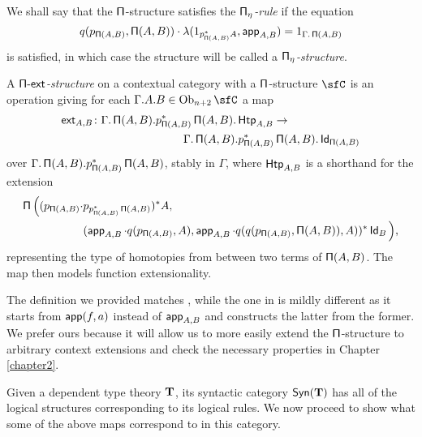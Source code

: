 \begin{defn}
\noindent
  We shall say that the $\operatorname{\mathsf{\Pi}}$-structure satisfies the
  \emph{$\operatorname{\mathsf{\Pi}_\eta}$-rule} if the equation
  \[q(p_{\operatorname{\mathsf{\Pi}}(A,B)},\operatorname{\mathsf{\Pi}}(A,B))\cdot\lambda(1_{p^*_{\operatorname{\mathsf{\Pi}}(A,B)}A},\operatorname{\mathsf{app}}_{A,B})=1_{\Gamma.\operatorname{\mathsf{\Pi}}(A,B)}\]
  is satisfied, in which case the structure will be called a
  \emph{$\operatorname{\mathsf{\Pi}_\eta}$-structure}. 

\noindent
  A \emph{$\operatorname{\mathsf{\Pi-ext}}$-structure} on a contextual category with a $\operatorname{\mathsf{\Pi}}$-structure
  $\sfC$ is an operation giving for each $\Gamma.A.B\in\Ob_{n+2}\sfC$ a map
  \begin{align*}
    \operatorname{\mathsf{ext}}_{A,B} &\colon
    \Gamma.\operatorname{\mathsf{\Pi}}(A,B).p^*_{\operatorname{\mathsf{\Pi}}(A,B)}\operatorname{\mathsf{\Pi}}(A,B).\operatorname{\mathsf{Htp}}_{A,B}\rightarrow \\
    &\quad\quad\quad\quad\quad\quad\quad\quad
    \Gamma.\operatorname{\mathsf{\Pi}}(A,B).p^*_{\operatorname{\mathsf{\Pi}}(A,B)}\operatorname{\mathsf{\Pi}}(A,B).\operatorname{\mathsf{Id}}_{\operatorname{\mathsf{\Pi}}(A,B)}
  \end{align*}
  over $\Gamma.\operatorname{\mathsf{\Pi}}(A,B).p^*_{\operatorname{\mathsf{\Pi}}(A,B)}\operatorname{\mathsf{\Pi}}(A,B)$, stably in $\Gamma$, where
  $\operatorname{\mathsf{Htp}}_{A,B}$ is a shorthand for the extension
  \begin{align*}
    \operatorname{\mathsf{\Pi}}\Big((p_{\operatorname{\mathsf{\Pi}}(A,B)}\cdot & p_{p^*_{\operatorname{\mathsf{\Pi}}(A,B)}\operatorname{\mathsf{\Pi}}(A,B)})^*A, \\
    &(\operatorname{\mathsf{app}}_{A,B}\cdot q(p_{\operatorname{\mathsf{\Pi}}(A,B)},A),
    \operatorname{\mathsf{app}}_{A,B}\cdot q(q(p_{\operatorname{\mathsf{\Pi}}(A,B)},\operatorname{\mathsf{\Pi}}(A,B)),A))^*\operatorname{\mathsf{Id}}_B\Big),
  \end{align*}
  representing the type of homotopies from between two terms of $\operatorname{\mathsf{\Pi}}(A,B)$. The
  map then models function extensionality.
\end{defn}

\begin{rmk}
  The definition we provided matches \cite[Def.~2.5]{KL18}, while the one in
  \cite[App.~B.1.1]{KL12} is mildly different as it starts from
  $\operatorname{\mathsf{app}}(f,a)$ instead of $\operatorname{\mathsf{app}}_{A,B}$ and constructs the latter from the
  former. We prefer ours because it will allow us to more easily extend the
  $\operatorname{\mathsf{\Pi}}$-structure to arbitrary context extensions and check the necessary
  properties in Chapter \ref{chapter2}.
\end{rmk}

\begin{exmp}
  Given a dependent type theory $\operatorname{\mathbf{T}}$, its syntactic category $\mathsf{Syn}(\mathbf{T})$ has all
  of the logical structures corresponding to its logical rules. We now proceed
  to show what some of the above maps correspond to in this category.
\end{exmp}

